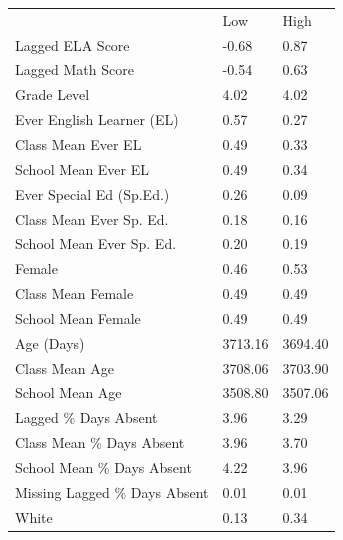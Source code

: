 \documentclass[12pt]{article}
\theoremstyle{definition}
\theoremstyle{definition}
\theoremstyle{definition}
\theoremstyle{definition}
\begin{document}
\begin{table}[]
\begin{tabular}{lll}
                                                        & Low     & High    \\
Lagged ELA Score                                        & -0.68   & 0.87    \\
Lagged Math Score                                       & -0.54   & 0.63    \\
Grade Level                                             & 4.02    & 4.02    \\
Ever English Learner (EL)                               & 0.57    & 0.27    \\
Class Mean Ever EL                                      & 0.49    & 0.33    \\
School Mean Ever EL                                     & 0.49    & 0.34    \\
Ever Special Ed (Sp.Ed.)                                & 0.26    & 0.09    \\
Class Mean Ever Sp. Ed.                                 & 0.18    & 0.16    \\
School Mean Ever Sp. Ed.                                & 0.20    & 0.19    \\
Female                                                  & 0.46    & 0.53    \\
Class Mean Female                                       & 0.49    & 0.49    \\
School Mean Female                                      & 0.49    & 0.49    \\
Age (Days)                                              & 3713.16 & 3694.40 \\
Class Mean Age                                          & 3708.06 & 3703.90 \\
School Mean Age                                         & 3508.80 & 3507.06 \\
Lagged \% Days Absent                                   & 3.96    & 3.29    \\
Class Mean \% Days Absent                               & 3.96    & 3.70    \\
School Mean \% Days Absent                              & 4.22    & 3.96    \\
Missing Lagged \% Days Absent                           & 0.01    & 0.01    \\
White                                                   & 0.13    & 0.34    \\

\end{tabular}
\end{table}
\end{document}
